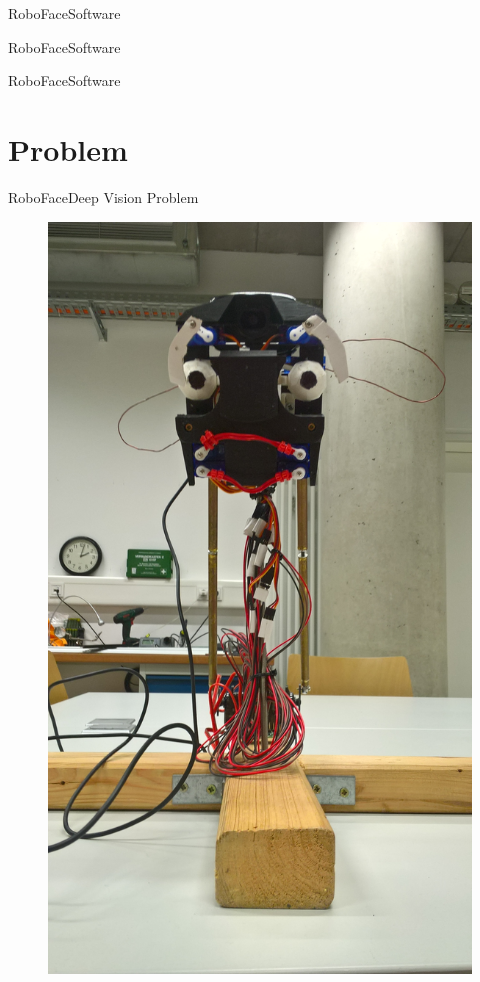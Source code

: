 \documentclass{beamer}
\begin{document}
\begin{frame}{RoboFace}{Software}
    \lstServoConfig
\end{frame}

\begin{frame}{RoboFace}{Software}
    \lstServoConstraints
\end{frame}

\begin{frame}{RoboFace}{Software}
    \lstFaceBackend
\end{frame}

\section{Problem}
\begin{frame}{RoboFace}{Deep Vision Problem}
	\begin{figure}
		\centering
		\vspace*{-18mm}
		\includegraphics[width=0.8\linewidth,angle=270]{figures/roboFace}
		\label{fig:face}
	\end{figure}
\end{frame}
\end{document}
